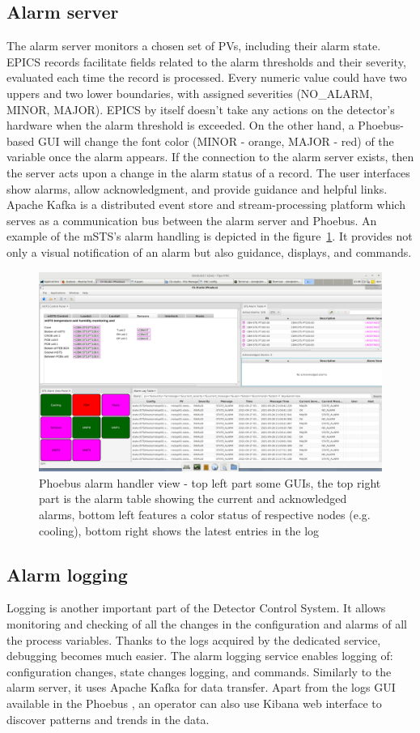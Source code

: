 \subsection{Alarm server}
The alarm server monitors a chosen set of \gls{PV}s, including their alarm state. EPICS records facilitate fields related to the alarm thresholds and their severity, evaluated each time the record is processed. Every numeric value could have two uppers and two lower boundaries, with assigned severities (NO\_ALARM, MINOR, MAJOR). EPICS by itself doesn't take any actions on the detector's hardware when the alarm threshold is exceeded. On the other hand, a Phoebus-based GUI will change the font color (MINOR - orange, MAJOR - red) of the variable once the alarm appears. If the connection to the alarm server exists, then the server acts upon a change in the alarm status of a record. The user interfaces show alarms, allow acknowledgment, and provide guidance and helpful links. Apache Kafka is a distributed event store and stream-processing platform which serves as a communication bus between the alarm server and Phoebus. An example of the mSTS's alarm handling is depicted in the figure~\ref{fig_alarm1}. It provides not only a visual notification of an alarm but also guidance, displays, and commands.
\begin{figure}[!h]
\centering
\includegraphics[width=0.75\columnwidth]{Chapter4/images/alarms.png}
\caption{Phoebus alarm handler view -  top left part some \gls{GUI}s, the top right part is the alarm table showing the current and acknowledged alarms, bottom left features a color status of respective nodes (e.g. cooling), bottom right shows the latest entries in the log}
\label{fig_alarm1}
\end{figure}
\newpage
\subsection{Alarm logging}
Logging is another important part of the Detector Control System. It allows monitoring and checking of all the changes in the configuration and alarms of all the process variables. Thanks to the logs acquired by the dedicated service, debugging becomes much easier. The alarm logging service enables logging of: configuration changes, state changes logging, and commands. Similarly to the alarm server, it uses Apache Kafka for data transfer. Apart from the logs \gls{GUI} available in the Phoebus \cite{alarm_logger}, an operator can also use Kibana web interface to discover patterns and trends in the data. 

